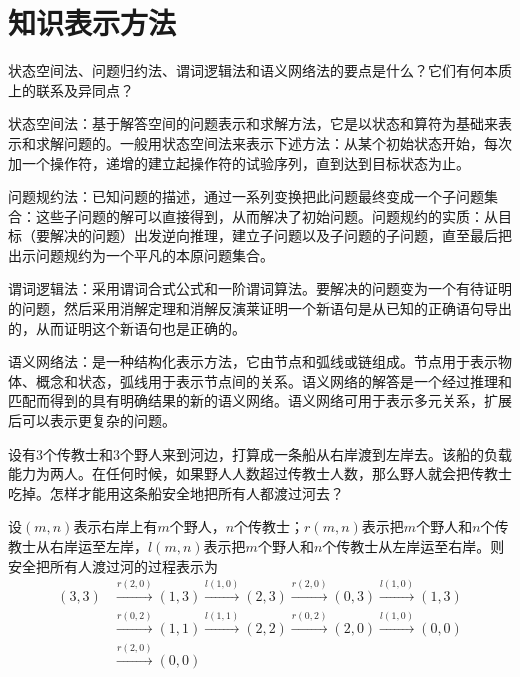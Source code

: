 \chapter{知识表示方法}

\begin{question}
状态空间法、问题归约法、谓词逻辑法和语义网络法的要点是什么？它们有何本质上的联系及异同点？
\end{question}	
\begin{solution}
状态空间法：基于解答空间的问题表示和求解方法，它是以状态和算符为基础来表示和求解问题的。一般用状态空间法来表示下述方法：从某个初始状态开始，每次加一个操作符，递增的建立起操作符的试验序列，直到达到目标状态为止。 \par
问题规约法：已知问题的描述，通过一系列变换把此问题最终变成一个子问题集合：这些子问题的解可以直接得到，从而解决了初始问题。问题规约的实质：从目标（要解决的问题）出发逆向推理，建立子问题以及子问题的子问题，直至最后把出示问题规约为一个平凡的本原问题集合。 \par
谓词逻辑法：采用谓词合式公式和一阶谓词算法。要解决的问题变为一个有待证明的问题，然后采用消解定理和消解反演莱证明一个新语句是从已知的正确语句导出的，从而证明这个新语句也是正确的。\par
语义网络法：是一种结构化表示方法，它由节点和弧线或链组成。节点用于表示物体、概念和状态，弧线用于表示节点间的关系。语义网络的解答是一个经过推理和匹配而得到的具有明确结果的新的语义网络。语义网络可用于表示多元关系，扩展后可以表示更复杂的问题。
\end{solution}

\begin{question}
设有$3$个传教士和$3$个野人来到河边，打算成一条船从右岸渡到左岸去。该船的负载能力为两人。在任何时候，如果野人人数超过传教士人数，那么野人就会把传教士吃掉。怎样才能用这条船安全地把所有人都渡过河去？
\end{question}
\begin{solution}
设$(m,n)$表示右岸上有$m$个野人，$n$个传教士；$r(m,n)$表示把$m$个野人和$n$个传教士从右岸运至左岸，$l(m,n)$表示把$m$个野人和$n$个传教士从左岸运至右岸。则安全把所有人渡过河的过程表示为
\begin{align*}
(3,3) & \xrightarrow{r(2,0)} (1,3) \xrightarrow{l(1,0)} (2,3) 
		\xrightarrow{r(2,0)} (0,3) \xrightarrow{l(1,0)} (1,3) \\
	& \xrightarrow{r(0,2)} (1,1) \xrightarrow{l(1,1)} (2,2) 
		\xrightarrow{r(0,2)} (2,0) \xrightarrow{l(1,0)} (0,0) \\
	& \xrightarrow{r(2,0)} (0,0)
\end{align*}
\end{solution}

